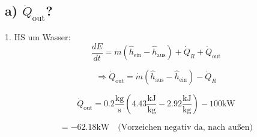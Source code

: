 \subsection*{a) $\dot{Q}_{\text{out}}$?}

1. HS um Wasser:
\[
\frac{dE}{dt} = \dot{m} (\hat{h}_{\text{ein}} - \hat{h}_{\text{aus}}) + \dot{Q}_R + \dot{Q}_{\text{out}}
\]

\[
\Rightarrow \dot{Q}_{\text{out}} = \dot{m} (\hat{h}_{\text{aus}} - \hat{h}_{\text{ein}}) - \dot{Q}_R
\]

\[
\dot{Q}_{\text{out}} = 0.2 \frac{\text{kg}}{\text{s}} (4.43 \frac{\text{kJ}}{\text{kg}} - 2.92 \frac{\text{kJ}}{\text{kg}}) - 100 \text{kW}
\]

\[
= -62.18 \text{kW} \quad \text{(Vorzeichen negativ da, nach außen)}
\]